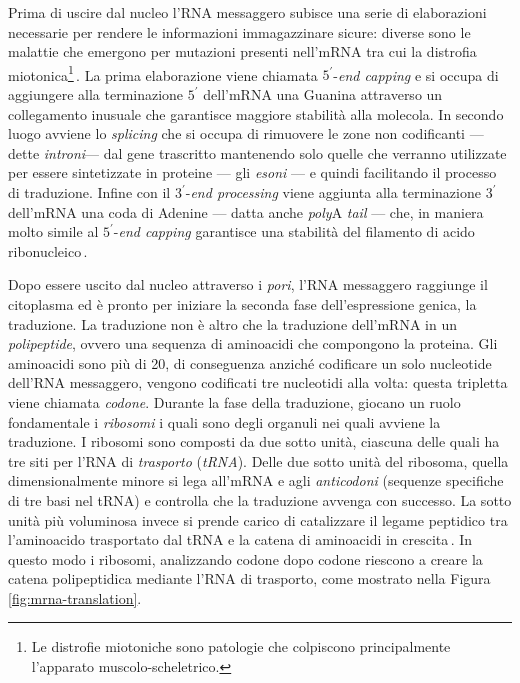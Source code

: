 Prima di uscire dal nucleo l'\acs{RNA} messaggero subisce una serie di elaborazioni necessarie per rendere le informazioni immagazzinare sicure: diverse sono le malattie che emergono per mutazioni presenti nell'\acs{mRNA} tra cui la distrofia miotonica\footnote{Le distrofie miotoniche sono patologie che colpiscono principalmente l'apparato muscolo-scheletrico.}\,\cite{philips2000rna}. La prima elaborazione viene chiamata $5^\prime$-\textit{end capping} e si occupa di aggiungere alla terminazione $5^\prime$ dell'\acs{mRNA} una Guanina attraverso un collegamento inusuale che garantisce maggiore stabilità alla molecola. In secondo luogo avviene lo \textit{splicing} che si occupa di rimuovere le zone non codificanti — dette \textsl{introni}— dal gene trascritto mantenendo solo quelle che verranno utilizzate per essere sintetizzate in proteine — gli \textsl{esoni} — e quindi facilitando il processo di traduzione. Infine con il $3^\prime$-\textit{end processing} viene aggiunta alla terminazione $3^\prime$ dell'\acs{mRNA} una coda di Adenine — datta anche \textit{poly}A \textit{tail} — che, in maniera molto simile al $5^\prime$-\textit{end capping} garantisce una stabilità del filamento di acido ribonucleico\,\cite{hocine2010rna, livingstone2010mechanisms}.

Dopo essere uscito dal nucleo attraverso i \textsl{pori}, l'\acs{RNA} messaggero raggiunge il citoplasma ed è pronto per iniziare la seconda fase dell'espressione genica, la traduzione. La traduzione non è altro che la traduzione dell'\acs{mRNA} in un \textsl{polipeptide}, ovvero una sequenza di aminoacidi che compongono la proteina. Gli aminoacidi sono più di 20, di conseguenza anziché codificare un solo nucleotide dell'\acs{RNA} messaggero, vengono codificati tre nucleotidi alla volta: questa tripletta viene chiamata \textsl{codone}. Durante la fase della traduzione, giocano un ruolo fondamentale i \textsl{ribosomi} i quali sono degli organuli nei quali avviene la traduzione. I ribosomi sono composti da due sotto unità, ciascuna delle quali ha tre siti per l'\acs{RNA} di \textsl{trasporto} (\textsl{tRNA}). Delle due sotto unità del ribosoma, quella dimensionalmente minore si lega all'\acs{mRNA} e agli \textsl{anticodoni} (sequenze specifiche di tre basi nel tRNA) e controlla che la traduzione avvenga con successo. La sotto unità più voluminosa invece si prende carico di catalizzare il legame peptidico tra l'aminoacido trasportato dal tRNA e la catena di aminoacidi in crescita\,\cite{ramakrishnan2002ribosome, lemonniermarathon, livingstone2010mechanisms}. In questo modo i ribosomi, analizzando codone dopo codone riescono a creare la catena polipeptidica mediante l'\acs{RNA} di trasporto, come mostrato nella Figura\,\ref{fig:mrna-translation}.

